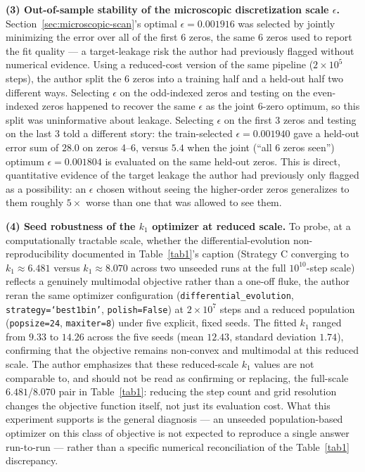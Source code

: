 \documentclass[mca,article,submit,oneauthor,pdftex]{Definitions/mdpi}
\begin{document}
\textbf{(3) Out-of-sample stability of the microscopic discretization
scale $\epsilon$.} Section~\ref{sec:microscopic-scan}'s optimal
$\epsilon=0.001916$ was selected by jointly minimizing the error over
all of the first 6 zeros, the same 6 zeros used to report the fit
quality --- a target-leakage risk the author had previously flagged without
numerical evidence. Using a reduced-cost version of the same pipeline
($2\times10^5$ steps), the author split the 6 zeros into a training half and a
held-out half two different ways. Selecting $\epsilon$ on the
odd-indexed zeros and testing on the even-indexed zeros happened to
recover the same $\epsilon$ as the joint 6-zero optimum, so this split
was uninformative about leakage. Selecting $\epsilon$ on the first 3
zeros and testing on the last 3 told a different story: the
train-selected $\epsilon=0.001940$ gave a held-out error sum of $28.0$
on zeros 4--6, versus $5.4$ when the joint (``all 6 zeros seen'')
optimum $\epsilon=0.001804$ is evaluated on the same held-out zeros.
This is direct, quantitative evidence of the target leakage the author had
previously only flagged as a possibility: an $\epsilon$ chosen without
seeing the higher-order zeros generalizes to them roughly $5\times$
worse than one that was allowed to see them.

\textbf{(4) Seed robustness of the $k_1$ optimizer at reduced scale.}
To probe, at a computationally tractable scale, whether the
differential-evolution non-reproducibility documented in
Table~\ref{tab1}'s caption (Strategy C converging to $k_1\approx6.481$
versus $k_1\approx8.070$ across two unseeded runs at the full
$10^{10}$-step scale) reflects a genuinely multimodal objective rather
than a one-off fluke, the author reran the same optimizer configuration
(\texttt{differential\_evolution}, \texttt{strategy=`best1bin'},
\texttt{polish=False}) at $2\times10^7$ steps and a reduced population
(\texttt{popsize=24}, \texttt{maxiter=8}) under five explicit, fixed
seeds. The fitted $k_1$ ranged from $9.33$ to $14.26$ across the five
seeds (mean $12.43$, standard deviation $1.74$), confirming that the
objective remains non-convex and multimodal at this reduced scale.
The author emphasizes that these reduced-scale $k_1$ values are not comparable to,
and should not be read as confirming or replacing, the full-scale
$6.481$/$8.070$ pair in Table~\ref{tab1}: reducing the step count and
grid resolution changes the objective function itself, not just its
evaluation cost. What this experiment supports is the general
diagnosis --- an unseeded population-based optimizer on this class of
objective is not expected to reproduce a single answer run-to-run ---
rather than a specific numerical reconciliation of the Table~\ref{tab1}
discrepancy.
\end{document}
